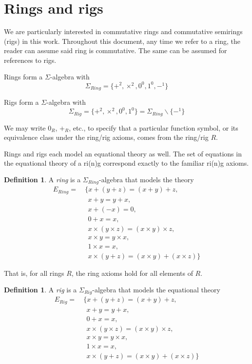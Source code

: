 \documentclass{msthesis}
\theoremstyle{definition}
\newtheorem{definition}[theorem]{Definition}
\begin{document}
\section{Rings and rigs}

We are particularly interested in commutative rings and commutative semirings (rigs) in this work.  Throughout this document, any time we refer to a ring, the reader can assume said ring is commutative.  The same can be assumed for references to rigs.

Rings form a $\Sigma$-algebra with 
\[ \Sigma_{Ring}=\{+^2, \times^2, 0^0, 1^0, -^1\}\]

Rigs form a $\Sigma$-algebra with
\[ \Sigma_{Rig}=\{+^2, \times^2, 0^0, 1^0\} = \Sigma_{Ring}\backslash\{-^1\}\]

We may write $0_R$, $+_R$, etc., to specify that a particular function symbol, or its equivalence class under the ring/rig axioms, comes from the ring/rig $R$.

Rings and rigs each model an equational theory as well.  The set of equations in the equational theory of a ri(n)g correspond exactly to the familiar ri(n)g axioms.

\begin{definition}\label{def:ring}
A \emph{ring} is a $\Sigma_{Ring}$-algebra that models the theory
\begin{align*}
    E_{Ring} =&\ \{x+(y+z) =(x+y)+z, \\
                   &\ \ \ x + y = y + x,\\
                   &\ \ \ x + (-x) = 0, \\
                   &\ \ \ 0 + x = x, \\
                   &\ \ \ x\times(y\times z) = (x \times y) \times z, \\
                   &\ \ \ x \times y = y \times x, \\
                   &\ \ \ 1 \times x = x, \\
                   &\ \ \ x \times (y + z) = (x \times y) + (x \times z)\}
\end{align*}
\end{definition}
That is, for all rings $R$, the ring axioms hold for all elements of $R$. 

\begin{definition}\label{def:rig}
A \emph{rig} is a $\Sigma_{Rig}$-algebra that models the equational theory
\begin{align*}
    E_{Rig} =&\ \{x+(y+z) =(x+y)+z, \\
             &\ \ \ x + y = y + x,\\
             &\ \ \ 0 + x = x, \\
             &\ \ \ x\times(y\times z) = (x \times y) \times z, \\
             &\ \ \ x \times y = y \times x, \\
             &\ \ \ 1 \times x = x, \\
             &\ \ \ x \times (y + z) = (x \times y) + (x \times z)\}
\end{align*}
\end{definition}
\end{document}
